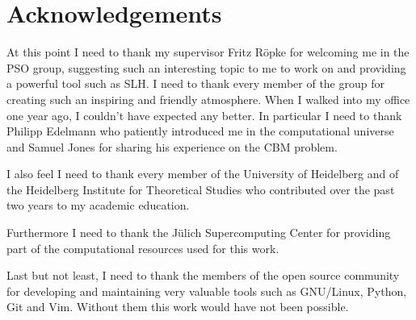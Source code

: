 \chapter*{Acknowledgements}
\thispagestyle{empty}
At this point I need to thank my supervisor Fritz Röpke for welcoming me in the PSO group, suggesting such an interesting topic to me to work on and providing a powerful tool such as SLH. I need to thank every member of the group for creating such an inspiring and friendly atmosphere. When I walked into my office one year ago, I couldn't have expected any better. In particular I need to thank Philipp Edelmann who patiently introduced me in the computational universe and Samuel Jones for sharing his experience on the CBM problem.

I also feel I need to thank every member of the University of Heidelberg and of the Heidelberg Institute for Theoretical Studies who contributed over the past two years to my academic education.

Furthermore I need to thank the Jülich Supercomputing Center for providing part of the computational resources used for this work.

Last but not least, I need to thank the members of the open source community for developing and maintaining very valuable tools such as GNU/Linux, Python, Git and Vim. Without them this work would have not been possible.

